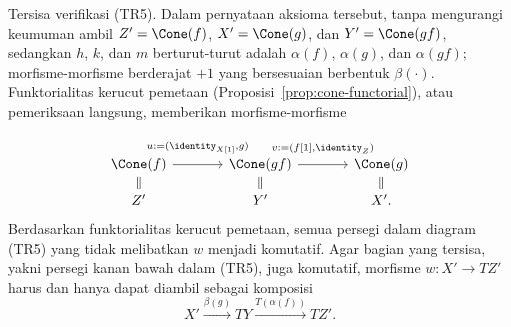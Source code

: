 \begin{bukti}
	Tersisa verifikasi (TR5). Dalam pernyataan aksioma tersebut, tanpa mengurangi
	keumuman ambil $Z' = \Cone(f)$, $X' = \Cone(g)$, dan
	$Y' = \Cone(gf)$, sedangkan $h$, $k$, dan $m$ berturut-turut adalah
	$\alpha(f)$, $\alpha(g)$, dan $\alpha(gf)$; morfisme-morfisme berderajat
	$+1$ yang bersesuaian berbentuk $\beta(\cdot)$. Funktorialitas kerucut
	pemetaan (Proposisi~\ref{prop:cone-functorial}), atau pemeriksaan langsung,
	memberikan morfisme-morfisme
	\[\begin{tikzcd}[column sep=large, row sep=small]
		\Cone(f) \arrow[r, "{u := (\identity_{X[1]}, g)}" inner sep=0.8em] & \Cone(gf) \arrow[r, "{v := (f[1], \identity_Z)}" inner sep=0.8em] & \Cone(g) \\
		Z' \arrow[equal, u] & Y' \arrow[equal, u] & X' \arrow[equal, u] .
	\end{tikzcd}\]
	Berdasarkan funktorialitas kerucut pemetaan, semua persegi dalam diagram
	(TR5) yang tidak melibatkan $w$ menjadi komutatif. Agar bagian yang tersisa,
	yakni persegi kanan bawah dalam (TR5), juga komutatif, morfisme
	$w: X' \to TZ'$ harus dan hanya dapat diambil sebagai komposisi
	\[ X' \xrightarrow{\beta(g)} TY \xrightarrow{T(\alpha(f))} T Z' . \]


\end{bukti}

